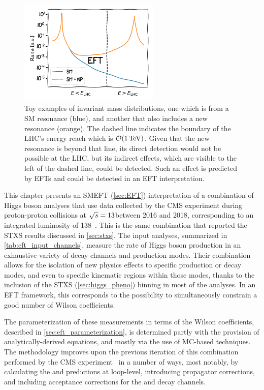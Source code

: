 \begin{figure}
  \centering
  \includegraphics[width=0.6\textwidth]{Figures/EFT/xkcd.pdf}
  \caption[Illustration of EFT Effects in High-Energy Tails of Distributions]{Toy examples of invariant mass distributions, one which is from a SM resonance (blue), and another that also includes a new resonance (orange). The dashed line indicates the boundary of the LHC's energy reach which is $\mathcal{O}(1\,\text{Te\hspace{-.08em}V})$. Given that the new resonance is beyond that line, its direct detection would not be possible at the LHC, but its indirect effects, which are visible to the left of the dashed line, could be detected. Such an effect is predicted by EFTs and could be detected in an EFT interpretation.}\label{fig:eft_xkcd}
\end{figure}

This chapter presents an SMEFT (\cref{sec:EFT}) interpretation of a combination of Higgs boson analyses that use data collected by the CMS experiment during proton-proton collisions at $\sqrt{s}=13$\TeV between 2016 and 2018, corresponding to an integrated luminosity of 138\fbinv~\cite{CMS-PAS-HIG-21-018}. This is the same combination that reported the STXS results discussed in \cref{sec:stxs}. The input analyses, summarized in \cref{tab:eft_input_channels}, measure the rate of Higgs boson production in an exhaustive variety of decay channels and production modes. Their combination allows for the isolation of new physics effects to specific production or decay modes, and even to specific kinematic regions within those modes, thanks to the inclusion of the STXS (\cref{sec:higgs_pheno}) binning in most of the analyses. In an EFT framework, this corresponds to the possibility to simultaneously constrain a good number of Wilson coefficients. 



The parameterization of these measurements in terms of the Wilson coefficients, described in \cref{sec:eft_parameterization}, is determined partly with the provision of analytically-derived equations, and mostly via the use of MC-based techniques. The methodology improves upon the previous iteration of this combination performed by the CMS experiment~\cite{CMS:2020gsy} in a number of ways, most notably, by calculating the \ggH and \ggZH predictions at loop-level, introducing propagator corrections, and including acceptance corrections for the \Hfl and \Hlnulnu decay channels.

